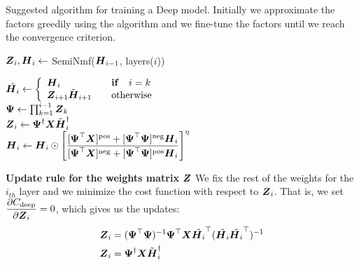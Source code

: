 \documentclass[10pt,journal,compsoc]{IEEEtran}
\begin{document}
\begin{algorithm}[tb]
\caption{Suggested algorithm for training a Deep \seminmf model\protect\footnotemark. Initially we approximate the factors greedily using the \textsc{\seminmf} algorithm \cite{ding2010convex} and we fine-tune the factors until we reach the convergence criterion.}

    \begin{algorithmic}
    \label{algo:deepnmfalgo}
        \STATE{}
            \STATE ${\boldsymbol{Z}}_i, {\boldsymbol{H}}_i \gets  $ {\sc SemiNmf}(${\boldsymbol{H}}_{i-1}$, layers($i$)) 
        \ENDFOR

        \STATE{}

        \REPEAT
                \STATE
       $\tilde{{\boldsymbol{H}}_i} \gets \left\{
          \begin{array}{l l}
            {\boldsymbol{H}}_i           & \quad \text{\textbf{if}} \quad i = k \\
            {\boldsymbol{Z}}_{i+1} \tilde{\boldsymbol{H}}_{i+1} & \quad \text{otherwise}\\
          \end{array}\right.$ \\
       ${\boldsymbol{\Psi}} \gets  \prod_{k=1}^{i-1}{{\boldsymbol{Z}}_k}$ \\
       ${\boldsymbol{Z}}_i \gets {\boldsymbol{\Psi}}^{\dagger} {\boldsymbol{X}} \tilde{\boldsymbol{H}}_i^{\dagger}$ \\
        ${\boldsymbol{H}}_i \gets  {\boldsymbol{H}}_i \odot \left[ \dfrac{[{\boldsymbol{\Psi}}^{\top} {\boldsymbol{X}}]^{\text{pos}} + [{\boldsymbol{\Psi}}^{\top} {\boldsymbol{\Psi}}]^{\text{neg}} {\boldsymbol{H}}_i }{[{\boldsymbol{\Psi}}^{\top} {\boldsymbol{X}}]^{\text{neg}} + [{\boldsymbol{\Psi}}^{\top} {\boldsymbol{\Psi}}]^{\text{pos}} {\boldsymbol{H}}_i }\right]^{\eta}$
            \ENDFOR
    \end{algorithmic}
\end{algorithm}
    

\textbf{Update rule for the weights matrix $\boldsymbol{Z}$}
We fix the rest of the weights for the $i_{th}$ layer and we minimize the cost function with respect to $\boldsymbol Z_i$. That is, we set $\dfrac{\partial C_\text{deep}}{{\partial {\boldsymbol Z}_i}} = 0$, 
which gives us the updates:
\begin{align}
\notag {\boldsymbol{Z}}_i &=  (\boldsymbol{\Psi}^{\top} \boldsymbol{\Psi})^{-1} \boldsymbol{\Psi}^{\top} \boldsymbol X \tilde{\boldsymbol H_i}^{\top} (\tilde{\boldsymbol H_i} \tilde{\boldsymbol H_i}^{\top})^{-1}  \\
{\boldsymbol{Z}}_i &= \boldsymbol{\Psi}^{\dagger} \boldsymbol X \tilde{\boldsymbol H}^{\dagger}_i
\label{eq:Z_update_rule}
\end{align}
\end{document}
